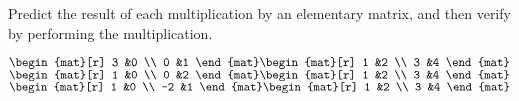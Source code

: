 
\begin{Exercise}[
name={},
title={}, 
difficulty=0,
origin={\cite{JH}}]
Predict the result of each multiplication by an elementary
matrix, and then verify by performing the multiplication.
\begin{multicols}{3}
\Question \( \begin{mat}[r]
                 3  &0  \\
                 0  &1
               \end{mat}
               \begin{mat}[r]
                 1  &2  \\
                 3  &4
               \end{mat} \)
\Question \( \begin{mat}[r]
                 1  &0  \\
                 0  &2
               \end{mat}
               \begin{mat}[r]
                 1  &2  \\
                 3  &4
               \end{mat} \)
\Question \( \begin{mat}[r]
                 1  &0  \\
                -2  &1
               \end{mat}
               \begin{mat}[r]
                 1  &2  \\
                 3  &4
               \end{mat} \)
\EndCurrentQuestion
\end{multicols}
\end{Exercise}

